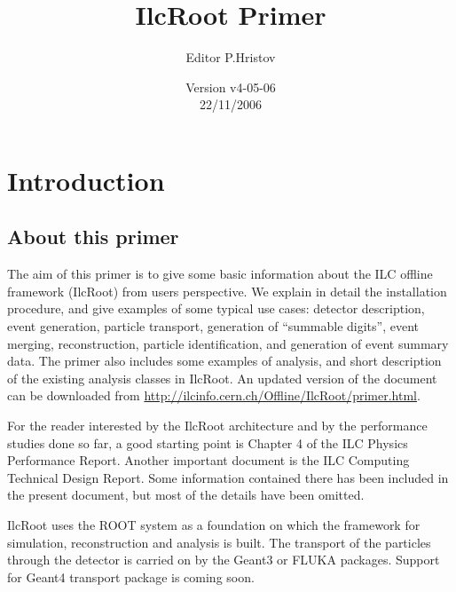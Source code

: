 \documentclass[12pt,a4paper,twoside]{article}
\begin{document}
\title{IlcRoot Primer}
\author{Editor P.Hristov}
\date{Version v4-05-06 \\
22/11/2006
}

\maketitle
\tableofcontents

\cleardoublepage 
\section{Introduction}\label{Introduction}



\subsection{About this primer}

The aim  of this primer  is to give  some basic information  about the
ILC offline  framework (IlcRoot) from users  perspective. We explain
in  detail  the installation  procedure,  and  give  examples of  some
typical  use cases: detector  description, event  generation, particle
transport,   generation  of   ``summable   digits'',  event   merging,
reconstruction,  particle  identification,  and  generation  of  event
summary data. The primer also  includes some examples of analysis, and
short  description of  the existing  analysis classes  in  IlcRoot. An
updated   version   of   the   document   can   be   downloaded   from
\url{http://ilcinfo.cern.ch/Offline/IlcRoot/primer.html}.

For  the reader  interested by  the  IlcRoot architecture  and by  the
performance studies done so far, a good starting point is Chapter 4 of
the  ILC  Physics  Performance Report\cite{PPR}.  Another  important
document is the ILC Computing Technical Design Report\cite{CompTDR}.
Some  information contained  there has  been included  in  the present
document, but most of the details have been omitted.

IlcRoot uses the  ROOT\cite{ROOT} system as a foundation  on which the
framework for  simulation, reconstruction  and analysis is  built. The
transport of the  particles through the detector is  carried on by the
Geant3\cite{Geant3}   or  FLUKA\cite{FLUKA}   packages.   Support  for
Geant4\cite{Geant4} transport package is coming soon.
\end{document}

